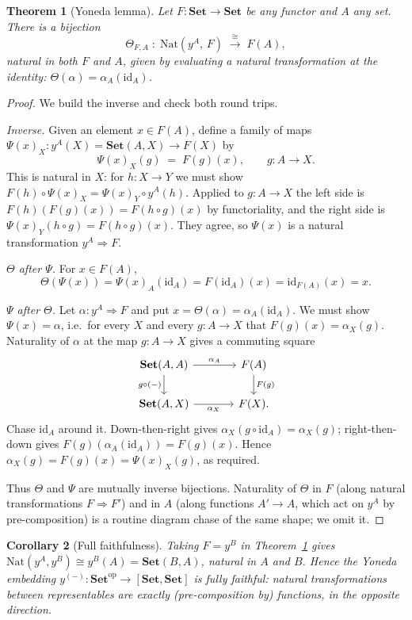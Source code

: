 \documentclass[11pt]{article}
\theoremstyle{plain}
\newtheorem{theorem}{Theorem}[section]
\newtheorem{corollary}[theorem]{Corollary}
\theoremstyle{definition}
\newcommand{\Set}{\mathbf{Set}}
\newcommand{\op}{^{\mathrm{op}}}
\newcommand{\yA}{y^{A}}
\newcommand{\Nat}{\mathrm{Nat}}
\newcommand{\id}{\mathrm{id}}
\newcommand{\iso}{\cong}
\begin{document}
\begin{theorem}[Yoneda lemma]
\label{thm:yoneda}
Let $F\colon\Set\to\Set$ be any functor and $A$ any set. There is a bijection
\[
  \Theta_{F,A}\;:\;\Nat(\yA,\,F)\;\xrightarrow{\ \iso\ }\;F(A),
\]
natural in both $F$ and $A$, given by evaluating a natural transformation at the
identity: $\Theta(\alpha) = \alpha_{A}(\id_{A})$.
\end{theorem}

\begin{proof}
We build the inverse and check both round trips.

\emph{Inverse.} Given an element $x\in F(A)$, define a family of maps
$\Psi(x)_{X}\colon \yA(X)=\Set(A,X)\to F(X)$ by
\[
  \Psi(x)_{X}(g) \;=\; F(g)(x),\qquad g\colon A\to X .
\]
This is natural in $X$: for $h\colon X\to Y$ we must show
$F(h)\circ\Psi(x)_{X} = \Psi(x)_{Y}\circ\yA(h)$. Applied to $g\colon A\to X$ the
left side is $F(h)(F(g)(x)) = F(h\circ g)(x)$ by functoriality, and the right side
is $\Psi(x)_{Y}(h\circ g) = F(h\circ g)(x)$. They agree, so $\Psi(x)$ is a
natural transformation $\yA\Rightarrow F$.

\emph{$\Theta$ after $\Psi$.} For $x\in F(A)$,
\[
  \Theta(\Psi(x)) = \Psi(x)_{A}(\id_{A}) = F(\id_{A})(x) = \id_{F(A)}(x) = x .
\]

\emph{$\Psi$ after $\Theta$.} Let $\alpha\colon\yA\Rightarrow F$ and put
$x=\Theta(\alpha)=\alpha_{A}(\id_{A})$. We must show $\Psi(x)=\alpha$, i.e.\ for
every $X$ and every $g\colon A\to X$ that $F(g)(x) = \alpha_{X}(g)$. Naturality of
$\alpha$ at the map $g\colon A\to X$ gives a commuting square
\[
\begin{tikzcd}[column sep=large]
  \Set(A,A) \arrow[r,"\alpha_{A}"] \arrow[d,"g\circ(-)"'] & F(A) \arrow[d,"F(g)"]\\
  \Set(A,X) \arrow[r,"\alpha_{X}"'] & F(X).
\end{tikzcd}
\]
Chase $\id_{A}$ around it. Down-then-right gives
$\alpha_{X}(g\circ\id_{A}) = \alpha_{X}(g)$; right-then-down gives
$F(g)(\alpha_{A}(\id_{A})) = F(g)(x)$. Hence $\alpha_{X}(g) = F(g)(x) =
\Psi(x)_{X}(g)$, as required.

Thus $\Theta$ and $\Psi$ are mutually inverse bijections. Naturality of $\Theta$
in $F$ (along natural transformations $F\Rightarrow F'$) and in $A$ (along
functions $A'\to A$, which act on $\yA$ by pre-composition) is a routine diagram
chase of the same shape; we omit it. \end{proof}

\begin{corollary}[Full faithfulness]
\label{cor:ff}
Taking $F=y^{B}$ in Theorem~\ref{thm:yoneda} gives
$\Nat(\yA,y^{B})\iso y^{B}(A)=\Set(B,A)$, natural in $A$ and $B$. Hence the
Yoneda embedding $y^{(-)}\colon\Set\op\to[\Set,\Set]$ is fully faithful: natural
transformations between representables are exactly (pre-composition by)
functions, in the opposite direction.
\end{corollary}
\end{document}
